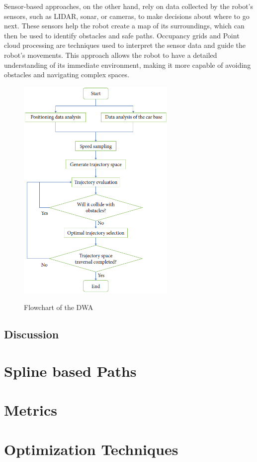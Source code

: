 Sensor-based approaches, on the other hand, rely on data collected by the robot's sensors, such as LIDAR, 
sonar, or cameras, to make decisions about where to go next. These sensors help the robot create a map of 
its surroundings, which can then be used to identify obstacles and safe paths. Occupancy grids and Point 
cloud processing are techniques used to interpret the sensor data and guide the 
robot's movements. This approach allows the robot to have a detailed understanding of its immediate 
environment, making it more capable of avoiding obstacles and navigating complex spaces.

\begin{figure}[H]
    \begin{center}
        \includegraphics[width=3in]{images/Chap1/DWA_flowchart.png}\\
        \caption{Flowchart of the DWA \cite{R19}}
        \label{flowchart of the DWA}
        \end{center}
\end{figure}

\subsection{Discussion}


\section{Spline based Paths}
\section{Metrics}
\section{Optimization Techniques}








